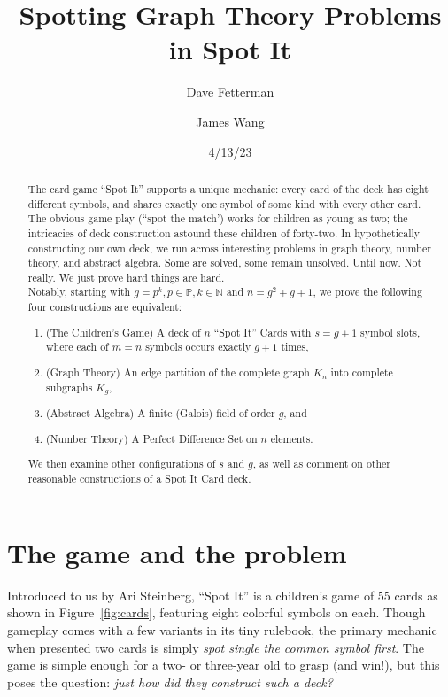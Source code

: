 \documentclass[11pt, oneside]{article} 	%
\title{Spotting Graph Theory Problems in Spot It}
\author[1]{Dave Fetterman}
\author[2]{James Wang}
\affil[1]{Obviously Unemployed}
\affil[2]{Surprisingly Employed}
\date{4/13/23}
\begin{document}
\maketitle

\begin{abstract}

The card game ``Spot It'' supports a unique mechanic: every card of the deck has eight different symbols, and shares exactly one symbol of some kind with every other card. The obvious game play (``spot the match') works for children as young as two; the intricacies of deck construction astound these children of forty-two. In hypothetically constructing our own deck, we run across interesting problems in graph theory, number theory, and abstract algebra. Some are solved, some remain unsolved. Until now. Not really. We just prove hard things are hard.
\\

Notably, starting with $g=p^k, p \in \mathbb{P}, k \in \mathbb{N}$ and $n = g^2+g+1$, we prove the following four constructions are equivalent:
\\
\begin{enumerate}
\item (The Children's Game) A deck of $n$ ``Spot It'' Cards with $s=g+1$ symbol slots, where each of $m = n$ symbols occurs exactly $g+1$ times,
\item (Graph Theory) An edge partition of the complete graph $K_n$ into complete subgraphs $K_g$,
\item (Abstract Algebra) A finite (Galois) field of order $g$, and
\item (Number Theory) A Perfect Difference Set\cite{1} on $n$ elements.
\end{enumerate} 
  
We then examine other configurations of $s$ and $g$, as well as comment on other reasonable constructions of a Spot It Card deck.

\end{abstract}

\section{The game and the problem}

Introduced to us by Ari Steinberg, ``Spot It'' is a children's game of 55 cards as shown in Figure~\ref{fig:cards}, featuring eight colorful symbols on each. Though gameplay comes with a few variants in its tiny rulebook, the primary mechanic when presented two cards is simply \emph{spot single the common symbol first}. The game is simple enough for a two- or three-year old to grasp (and win!), but this poses the question: \emph{just how did they construct such a deck?} 
\end{document}
